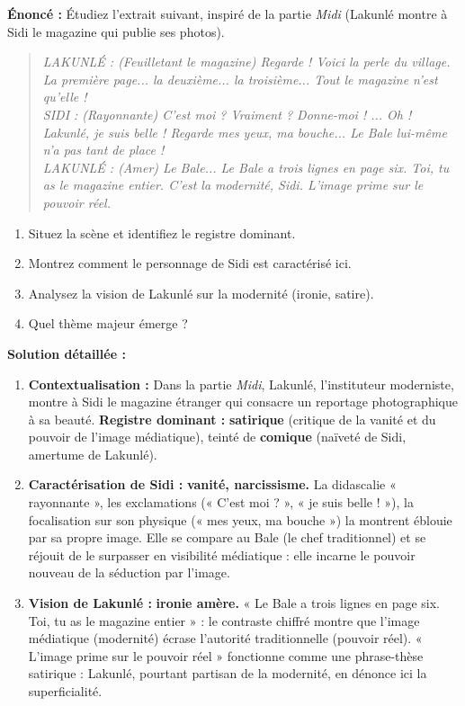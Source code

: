 \documentclass[11pt]{article}
\begin{document}
\begin{exoresolu}
\textbf{Énoncé :} Étudiez l'extrait suivant, inspiré de la partie \emph{Midi} (Lakunlé montre à Sidi le magazine qui publie ses photos).
\begin{quote}
\emph{LAKUNLÉ : (Feuilletant le magazine) Regarde ! Voici la perle du village. La première page... la deuxième... la troisième... Tout le magazine n'est qu'elle ! \\
SIDI : (Rayonnante) C'est moi ? Vraiment ? Donne-moi ! ... Oh ! Lakunlé, je suis belle ! Regarde mes yeux, ma bouche... Le Bale lui-même n'a pas tant de place ! \\
LAKUNLÉ : (Amer) Le Bale... Le Bale a trois lignes en page six. Toi, tu as le magazine entier. C'est la modernité, Sidi. L'image prime sur le pouvoir réel.}
\end{quote}
\begin{enumerate}
    \item Situez la scène et identifiez le registre dominant.
    \item Montrez comment le personnage de Sidi est caractérisé ici.
    \item Analysez la vision de Lakunlé sur la modernité (ironie, satire).
    \item Quel thème majeur émerge ?
\end{enumerate}
\tcblower
\textbf{Solution détaillée :}
\begin{enumerate}
    \item \textbf{Contextualisation :} Dans la partie \emph{Midi}, Lakunlé, l'instituteur moderniste, montre à Sidi le magazine étranger qui consacre un reportage photographique à sa beauté. \textbf{Registre dominant :} \textbf{satirique} (critique de la vanité et du pouvoir de l'image médiatique), teinté de \textbf{comique} (naïveté de Sidi, amertume de Lakunlé).
    \item \textbf{Caractérisation de Sidi :} \textbf{vanité, narcissisme.} La didascalie « rayonnante », les exclamations (« C'est moi ? », « je suis belle ! »), la focalisation sur son physique (« mes yeux, ma bouche ») la montrent éblouie par sa propre image. Elle se compare au Bale (le chef traditionnel) et se réjouit de le surpasser en visibilité médiatique : elle incarne le pouvoir nouveau de la séduction par l'image.
    \item \textbf{Vision de Lakunlé :} \textbf{ironie amère.} « Le Bale a trois lignes en page six. Toi, tu as le magazine entier » : le contraste chiffré montre que l'image médiatique (modernité) écrase l'autorité traditionnelle (pouvoir réel). « L'image prime sur le pouvoir réel » fonctionne comme une phrase-thèse satirique : Lakunlé, pourtant partisan de la modernité, en dénonce ici la superficialité.

\end{enumerate}
\end{exoresolu}
\end{document}
